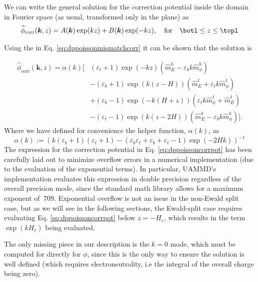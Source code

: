 \documentclass[twoside,openright,titlepage,numbers=noenddot,%
headinclude,footinclude,cleardoublepage=empty,abstract=on,
BCOR=5mm,fontsize=11pt, dvipsnames, paper=b5
]{scrreprt}
\renewcommand{\vec}[1]{\bm{#1}}
\newcommand{\uammd}{\gls{UAMMD}\xspace}
\newcommand{\fou}[1]{\widehat{#1}}
\newcommand{\corr}{\text{corr}}
\begin{document}
We can write the general solution for the correction potential inside the domain in Fourier space (as usual, transformed only in the plane) as 
\begin{equation}
  \label{eq:dppoissoncorrpoteq}
  \fou{\phi}_{\corr}(\vec{k}, z) = A(\vec{k})\exp(k z) + B(\vec{k})\exp(-kz), \quad \text{for} \quad \botl\le z\le \topl
\end{equation}

Using the \bcs in Eq. \eqref{eq:dppoissonmismatchcorr} it can be shown that the solution is

\begin{equation}
  \label{eq:dppoissoncorrpot}
  \begin{aligned}
    \fou{\phi}_{\corr}(\vec{k}, z) = \alpha(k)\bigg[ &(\varepsilon_t +1)\exp(-k z)(\fou{m}_E^b - \varepsilon_bk \fou{m}_\phi^b)\\
    &-(\varepsilon_b+1)\exp\left(k\left(z-H\right)\right)(\fou{m}_E^t + \varepsilon_tk\fou{m}_\phi^t)\\
    &+(\varepsilon_b-1)\exp\left(-k(H+z)\right)(\varepsilon_tk\fou{m}_\phi^t + \fou{m}_E^t)\\
    &-(\varepsilon_t -1)\exp\left(k(z-2H)\right)(\fou{m}_E^b - \varepsilon_bk\fou{m}_\phi^b)
    \bigg].
\end{aligned}
\end{equation}
Where we have defined for convenience the helper function, $\alpha(k)$, as
\begin{equation}
  \alpha(k) := \left(k(\varepsilon_b +1)(\varepsilon_t+1) - (\varepsilon_b\varepsilon_t + \varepsilon_b + \varepsilon_t -1)\exp(-2Hk) \right)^{-1}
\end{equation}
The expression for the correction potential in Eq. \eqref{eq:dppoissoncorrpot} has been carefully laid out to minimize overflow errors in a numerical implementation (due to the evaluation of the exponential terms). In particular, \uammd's implementation evaluates this expression in double precision regardless of the overall precision mode, since the standard math library allows for a maximum exponent of $~709$. Exponential overflow is not an issue in the non-Ewald split case, but as we will see in the following sections, the Ewald-split case requires evaluating Eq. \eqref{eq:dppoissoncorrpot} below $z=-H_e$, which results in the term $\exp(kH_e)$ being evaluated.

The only missing piece in our description is the $k=0$ mode, which must be computed for directly for $\phi$, since this is the only way to ensure the solution is well defined (which requires electroneutrality, i.e the integral of the overall charge being zero).
 
\end{document}
